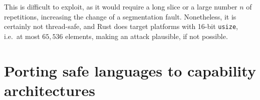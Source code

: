 \documentclass[dissertation.tex]{subfiles}
\begin{document}

This is difficult to exploit, as it would require a long slice or a
large number \(n\) of repetitions, increasing the change of a
segmentation fault.
Nonetheless, it is certainly not thread-safe, and Rust does target
platforms with 16-bit \texttt{usize}, i.e.\ at most \(65,536\) elements,
making an attack plausible, if not possible.


\section{Porting safe languages to capability architectures}
\end{document}
